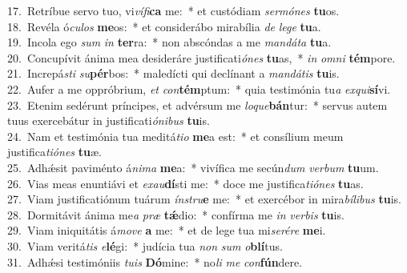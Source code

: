{17.~}Retríbue servo tuo, vi\textit{ví}\textit{fi}\textbf{ca} me:~* et custódiam \textit{ser}\textit{mó}\textit{nes} \textbf{tu}os.\\
{18.~}Revéla ó\textit{cu}\textit{los} \textbf{me}os:~* et considerábo mirabília \textit{de} \textit{le}\textit{ge} \textbf{tu}a.\\
{19.~}Incola ego \textit{sum} \textit{in} \textbf{ter}ra:~* non abscóndas a me \textit{man}\textit{dá}\textit{ta} \textbf{tu}a.\\
{20.~}Concupívit ánima mea desideráre justificati\textit{ó}\textit{nes} \textbf{tu}as,~* \textit{in} \textit{om}\textit{ni} \textbf{tém}pore.\\
{21.~}Increpá\textit{sti} \textit{su}\textbf{pér}bos:~* maledícti qui declínant a \textit{man}\textit{dá}\textit{tis} \textbf{tu}is.\\
{22.~}Aufer a me oppróbrium, \textit{et} \textit{con}\textbf{tém}ptum:~* quia testimónia tu\textit{a} \textit{ex}\textit{qui}\textbf{sí}vi.\\
{23.~}Etenim sedérunt príncipes, et advérsum me \textit{lo}\textit{que}\textbf{bán}tur:~* servus autem tuus exercebátur in justificati\textit{ó}\textit{ni}\textit{bus} \textbf{tu}is.\\
{24.~}Nam et testimónia tua meditá\textit{ti}\textit{o} \textbf{me}a est:~* et consílium meum justifica\textit{ti}\textit{ó}\textit{nes} \textbf{tu}æ.\\
{25.~}Adhǽsit paviménto á\textit{ni}\textit{ma} \textbf{me}a:~* vivífica me secún\textit{dum} \textit{ver}\textit{bum} \textbf{tu}um.\\
{26.~}Vias meas enuntiávi et \textit{e}\textit{xau}\textbf{dí}sti me:~* doce me justifica\textit{ti}\textit{ó}\textit{nes} \textbf{tu}as.\\
{27.~}Viam justificatiónum tuárum \textit{ín}\textit{stru}\textbf{e} me:~* et exercébor in mira\textit{bí}\textit{li}\textit{bus} \textbf{tu}is.\\
{28.~}Dormitávit ánima me\textit{a} \textit{præ} \textbf{tǽ}dio:~* confírma me \textit{in} \textit{ver}\textit{bis} \textbf{tu}is.\\
{29.~}Viam iniquitátis á\textit{mo}\textit{ve} \textbf{a} me:~* et de lege tua mi\textit{se}\textit{ré}\textit{re} \textbf{me}i.\\
{30.~}Viam veritá\textit{tis} \textit{e}\textbf{lé}gi:~* judícia tua \textit{non} \textit{sum} \textit{o}\textbf{blí}tus.\\
{31.~}Adhǽsi testimóniis \textit{tu}\textit{is} \textbf{Dó}mine:~* no\textit{li} \textit{me} \textit{con}\textbf{fún}dere.\\
